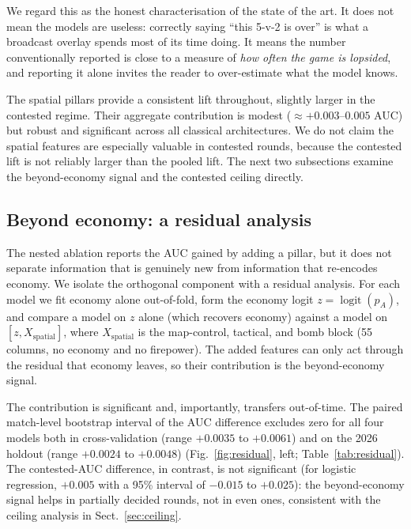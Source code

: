 \documentclass[11pt,a4paper]{article}
\begin{document}
We regard this as the honest characterisation of the state of the art. It does not mean the
models are useless: correctly saying ``this 5-v-2 is over'' is what a broadcast overlay
spends most of its time doing. It means the number conventionally reported is close to a
measure of \emph{how often the game is lopsided}, and reporting it alone invites the reader
to over-estimate what the model knows.

The spatial pillars provide a consistent lift throughout, slightly larger in the contested
regime. Their aggregate contribution is modest ($\approx +0.003$--$0.005$ AUC) but robust and
significant across all classical architectures. We do not claim the spatial features are
especially valuable in contested rounds, because the contested lift is not reliably larger than
the pooled lift. The next two subsections examine the beyond-economy signal and the contested
ceiling directly.

\subsection{Beyond economy: a residual analysis}
\label{sec:residual}

The nested ablation reports the AUC gained by adding a pillar, but it does not separate information
that is genuinely new from information that re-encodes economy. We isolate the orthogonal component
with a residual analysis. For each model we fit economy alone out-of-fold, form the economy logit
$z = \operatorname{logit}(p_A)$, and compare a model on $z$ alone (which recovers economy) against a
model on $[z, X_{\text{spatial}}]$, where $X_{\text{spatial}}$ is the map-control, tactical, and bomb
block (55 columns, no economy and no firepower). The added features can only act through the residual
that economy leaves, so their contribution is the beyond-economy signal.

The contribution is significant and, importantly, transfers out-of-time. The paired match-level
bootstrap interval of the AUC difference excludes zero for all four models both in cross-validation
(range $+0.0035$ to $+0.0061$) and on the 2026 holdout (range $+0.0024$ to $+0.0048$)
(Fig.~\ref{fig:residual}, left; Table~\ref{tab:residual}). The contested-AUC difference, in contrast,
is not significant (for logistic regression, $+0.005$ with a 95\% interval of $-0.015$ to $+0.025$):
the beyond-economy signal helps in partially decided rounds, not in even ones, consistent with the
ceiling analysis in Sect.~\ref{sec:ceiling}.
\end{document}
